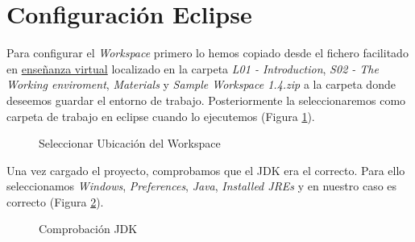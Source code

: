\documentclass{scrartcl}
\begin{document}
\section{Configuración Eclipse}
Para configurar el \textit{Workspace} primero lo hemos copiado desde el fichero facilitado en \href{htps://ev.us.es/}{enseñanza virtual} localizado en la carpeta \textit{L01 - Introduction}, \textit{S02 - The Working enviroment}, \textit{Materials} y \textit{Sample Workspace 1.4.zip} a la carpeta donde deseemos guardar el entorno de trabajo. Posteriormente la seleccionaremos como carpeta de trabajo en eclipse cuando lo ejecutemos (Figura \ref{fig:ConfEcl01}).

\begin{figure}[H]
	
	\centering
	\caption{Seleccionar Ubicación del Workspace}
	\label{fig:ConfEcl01}
	
\end{figure}

Una vez cargado el proyecto, comprobamos que el JDK era el correcto. Para ello seleccionamos \textit{Windows}, \textit{Preferences}, \textit{Java}, \textit{Installed JREs} y en nuestro caso es correcto (Figura \ref{fig:ConfEcl02}).
\begin{figure}[H]
	
	\centering
	\caption{Comprobación JDK}
	\label{fig:ConfEcl02}
	
\end{figure}
\end{document}
